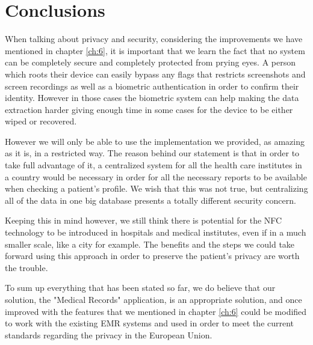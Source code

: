 \chapter{Conclusions}
\label{conclusions}

\par When talking about privacy and security, considering the improvements we have mentioned in chapter \ref{ch:6}, it is important that we learn the fact that no system can be completely secure and completely protected from prying eyes. A person which roots their device can easily bypass any flags that restricts screenshots and screen recordings as well as a biometric authentication in order to confirm their identity. However in those cases the biometric system can help making the data extraction harder giving enough time in some cases for the device to be either wiped or recovered.

However we will only be able to use the implementation we provided, as amazing as it is, in a restricted way. The reason behind our statement is that in order to take full advantage of it, a centralized system for all the health care institutes in a country would be necessary in order for all the necessary reports to be available when checking a patient's profile. We wish that this was not true, but centralizing all of the data in one big database presents a totally different security concern.

Keeping this in mind however, we still think there is potential for the NFC technology to be introduced in hospitals and medical institutes, even if in a much smaller scale, like a city for example. The benefits and the steps we could take forward using this approach in order to preserve the patient's privacy are worth the trouble.

To sum up everything that has been stated so far, we do believe that our solution, the "Medical Records" application, is an appropriate solution, and once improved with the features that we mentioned in chapter \ref{ch:6} could be modified to work with the existing EMR systems and used in order to meet the current standards regarding the privacy in the European Union.